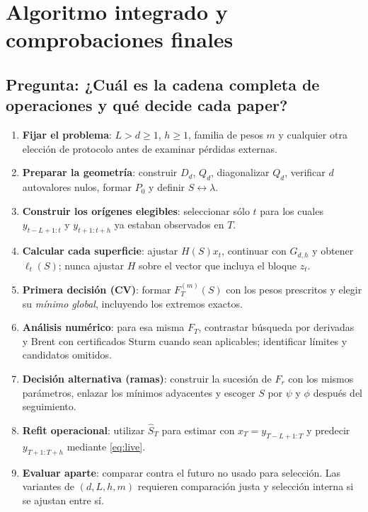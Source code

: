 \documentclass[11pt,letterpaper,parskip=half,headings=small]{scrartcl}
\theoremstyle{definition}\newtheorem{definicion}[proposicion]{Definición}
\theoremstyle{remark}\newtheorem{observacion}[proposicion]{Observación}
\newcommand{\pregunta}[1]{\subsection{Pregunta: #1}}
\begin{document}
\section{Algoritmo integrado y comprobaciones finales}
\pregunta{¿Cuál es la cadena completa de operaciones y qué decide cada paper?}
\begin{enumerate}[label=\arabic*.]
\item \textbf{Fijar el problema}: $L>d\geq1$, $h\geq1$, familia de pesos $m$ y cualquier otra elección de protocolo antes de examinar pérdidas externas.
\item \textbf{Preparar la geometría}: construir $D_d$, $Q_d$, diagonalizar $Q_d$, verificar $d$ autovalores nulos, formar $P_0$ y definir $S\leftrightarrow\lambda$.
\item \textbf{Construir los orígenes elegibles}: seleccionar sólo $t$ para los cuales $y_{t-L+1:t}$ y $y_{t+1:t+h}$ ya estaban observados en $T$.
\item \textbf{Calcular cada superficie}: ajustar $H(S)x_t$, continuar con $G_{d,h}$ y obtener $\ell_t(S)$; nunca ajustar $H$ sobre el vector que incluya el bloque $z_t$.
\item \textbf{Primera decisión (CV)}: formar $F_T^{(m)}(S)$ con los pesos prescritos y elegir su \emph{mínimo global}, incluyendo los extremos exactos.
\item \textbf{Análisis numérico}: para esa misma $F_T$, contrastar búsqueda por derivadas y Brent con certificados Sturm cuando sean aplicables; identificar límites y candidatos omitidos.
\item \textbf{Decisión alternativa (ramas)}: construir la sucesión de $F_r$ con los mismos parámetros, enlazar los mínimos adyacentes y escoger $S$ por $\psi$ y $\phi$ después del seguimiento.
\item \textbf{Refit operacional}: utilizar $\widehat S_T$ para estimar con $x_T=y_{T-L+1:T}$ y predecir $y_{T+1:T+h}$ mediante \eqref{eq:live}.
\item \textbf{Evaluar aparte}: comparar contra el futuro no usado para selección. Las variantes de $(d,L,h,m)$ requieren comparación justa y selección interna si se ajustan entre sí.
\end{enumerate}
\end{document}
